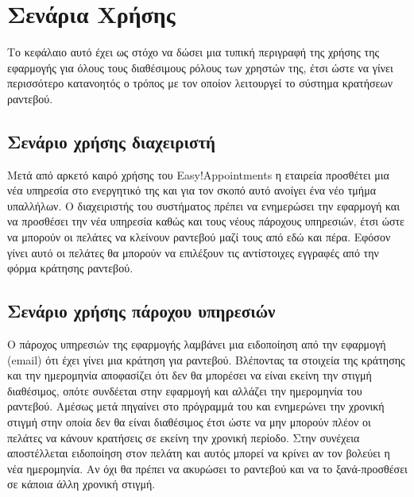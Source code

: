 
\chapter{Σενάρια Χρήσης}
Το κεφάλαιο αυτό έχει ως στόχο να δώσει μια τυπική περιγραφή της χρήσης της εφαρμογής για όλους τους διαθέσιμους ρόλους των χρηστών της, έτσι ώστε να γίνει περισσότερο κατανοητός ο τρόπος με τον οποίον λειτουργεί το σύστημα κρατήσεων ραντεβού.

\section{Σενάριο χρήσης διαχειριστή}
Μετά από αρκετό καιρό χρήσης του Easy!Appointments η εταιρεία προσθέτει μια νέα υπηρεσία στο ενεργητικό της και για τον σκοπό αυτό ανοίγει ένα νέο τμήμα υπαλλήλων. Ο διαχειριστής του συστήματος πρέπει να ενημερώσει την εφαρμογή και να προσθέσει την νέα υπηρεσία καθώς και τους νέους πάροχους υπηρεσιών, έτσι ώστε να μπορούν οι πελάτες να κλείνουν ραντεβού μαζί τους από εδώ και πέρα. Εφόσον γίνει αυτό οι πελάτες θα μπορούν να επιλέξουν τις αντίστοιχες εγγραφές από την φόρμα κράτησης ραντεβού.

\section{Σενάριο χρήσης πάροχου υπηρεσιών}
Ο πάροχος υπηρεσιών της εφαρμογής λαμβάνει μια ειδοποίηση από την εφαρμογή (email) ότι έχει γίνει μια κράτηση για ραντεβού. Βλέποντας τα στοιχεία της κράτησης και την ημερομηνία αποφασίζει ότι δεν θα μπορέσει να είναι εκείνη την στιγμή διαθέσιμος, οπότε συνδέεται στην εφαρμογή και αλλάζει την ημερομηνία του ραντεβού. Αμέσως μετά πηγαίνει στο πρόγραμμά του και ενημερώνει την χρονική στιγμή στην οποία δεν θα είναι διαθέσιμος έτσι ώστε να μην μπορούν πλέον οι πελάτες να κάνουν κρατήσεις σε εκείνη την χρονική περίοδο. Στην συνέχεια αποστέλλεται ειδοποίηση στον πελάτη και αυτός μπορεί να κρίνει αν τον βολεύει η νέα ημερομηνία. Αν όχι θα πρέπει να ακυρώσει το ραντεβού και να το ξανά-προσθέσει σε κάποια άλλη χρονική στιγμή. 

